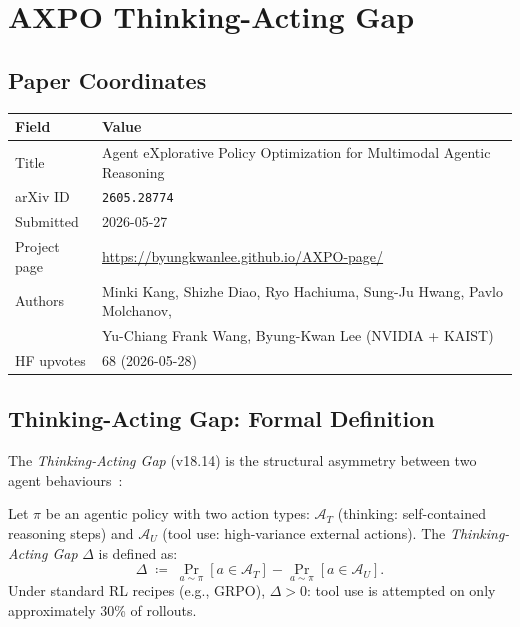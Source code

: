 \section{AXPO Thinking-Acting Gap}
\label{sec:axpo}

\subsection{Paper Coordinates}
\label{ssec:axpo-coords}

\begin{center}
\begin{tabular}{ll}
\textbf{Field} & \textbf{Value} \\
\hline
Title & Agent eXplorative Policy Optimization for Multimodal Agentic Reasoning \\
arXiv ID & \texttt{2605.28774} \\
Submitted & 2026-05-27 \\
Project page & \url{https://byungkwanlee.github.io/AXPO-page/} \\
Authors & Minki Kang, Shizhe Diao, Ryo Hachiuma, Sung-Ju Hwang, Pavlo Molchanov, \\
 & Yu-Chiang Frank Wang, Byung-Kwan Lee (NVIDIA + KAIST) \\
HF upvotes & 68 (2026-05-28) \\
\end{tabular}
\end{center}

\subsection{Thinking-Acting Gap: Formal Definition}
\label{ssec:axpo-gap}

The \emph{Thinking-Acting Gap} (v18.14) is the structural asymmetry between
two agent behaviours~\cite{axpo_2026}:

\begin{definition}
  \label{def:thinking-acting-gap}
  Let \(\pi\) be an agentic policy with two action types:
  \(\mathcal{A}_T\) (thinking: self-contained reasoning steps) and
  \(\mathcal{A}_U\) (tool use: high-variance external actions).
  The \emph{Thinking-Acting Gap} \(\Delta\) is defined as:
  \[
    \Delta \;\coloneqq\; \Pr_{a \sim \pi}[a \in \mathcal{A}_T] -
    \Pr_{a \sim \pi}[a \in \mathcal{A}_U].
  \]
  Under standard RL recipes (e.g., GRPO), \(\Delta > 0\): tool use is
  attempted on only approximately 30\% of rollouts.
\end{definition}

